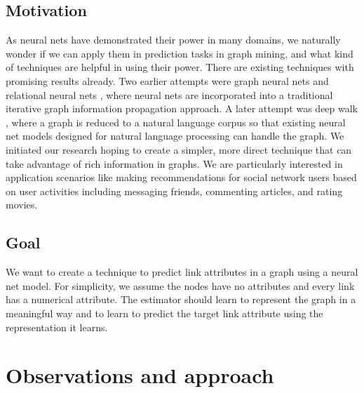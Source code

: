 \documentclass[twocolumn]{article}
\begin{document}
\subsection{Motivation}
As neural nets have demonstrated their power in many domains,
we naturally wonder if we can apply them in prediction tasks in graph mining,
and what kind of techniques are helpful in using their power.
There are existing techniques with promising results already.
Two earlier attempts were graph neural nets and relational neural 
nets \cite{scarselli2009graph}, 
where neural nets are incorporated into a traditional iterative graph 
information propagation approach.
A later attempt was deep walk \cite{perozzi2014deepwalk}, 
where a graph is reduced to a natural language corpus so that existing neural 
net models designed for natural language processing can handle the graph.
We initiated our research hoping to create a simpler, more direct technique 
that can take advantage of rich information in graphs.
We are particularly interested in application scenarios like making 
recommendations for social network users based on user activities including 
messaging friends, commenting articles, and rating movies.

\subsection{Goal}
We want to create a technique to predict link attributes in a graph using a 
neural net model.
For simplicity, we assume the nodes have no attributes and every link has a 
numerical attribute.
The estimator should learn to represent the graph in a meaningful way and to 
learn to predict the target link attribute using the representation it learns.

\section{Observations and approach}
\end{document}
